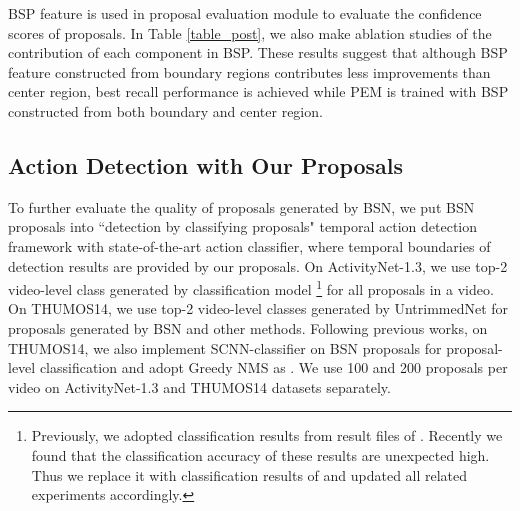\documentclass[runningheads]{llncs}
\begin{document}
BSP feature is used in proposal evaluation module to evaluate the confidence scores of proposals. In Table \ref{table_post}, we also make ablation studies of the contribution of each component in BSP.  These results suggest that although BSP feature constructed from   boundary regions contributes less improvements than  center region, best recall performance is achieved while PEM is trained with BSP constructed from both boundary and center region.





\vspace{-0.25cm}

\subsection{Action Detection with  Our Proposals}

To further evaluate the quality of proposals generated by BSN, we put BSN proposals into ``detection by classifying proposals" temporal action detection framework with state-of-the-art action classifier, where  temporal boundaries of detection results are provided by our proposals.
On ActivityNet-1.3, we use top-2 video-level class generated by classification model \cite{zhao2017cuhk}\footnote{Previously, we adopted classification results from result files of \cite{wang2016uts}. Recently we found that the classification accuracy of these results are unexpected high. Thus we replace it with classification results of \cite{zhao2017cuhk} and updated all related experiments accordingly.}  for all proposals in a video. %
On THUMOS14, we use top-2 video-level classes generated by UntrimmedNet \cite{wang2017untrimmednets} for proposals generated by BSN and other methods.%
Following  previous works,  on THUMOS14, we also implement SCNN-classifier on BSN proposals for proposal-level classification and  adopt Greedy NMS  as \cite{shou2016action}.
We use 100 and 200 proposals per video on ActivityNet-1.3  and THUMOS14 datasets separately.
\end{document}
